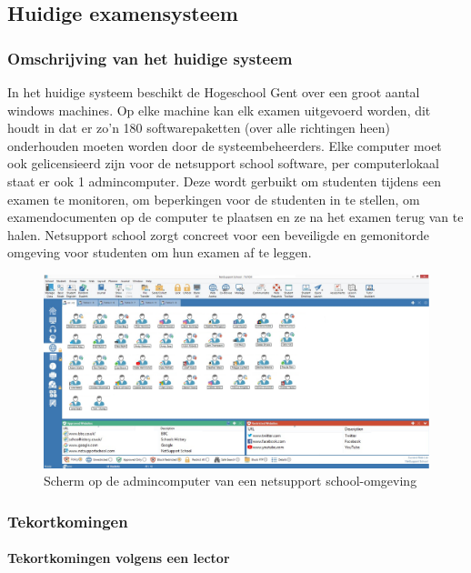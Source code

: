 \subsection{Huidige examensysteem}

\subsubsection{Omschrijving van het huidige systeem}
In het huidige systeem beschikt de Hogeschool Gent over een groot aantal windows machines. Op elke machine kan elk examen uitgevoerd worden, dit houdt in dat er zo'n 180 softwarepaketten (over alle richtingen heen) onderhouden moeten worden door de systeembeheerders. Elke computer moet ook gelicensieerd zijn voor de netsupport school software, per computerlokaal staat er ook 1 admincomputer. Deze wordt gerbuikt om studenten tijdens een examen te monitoren, om beperkingen voor de studenten in te stellen, om examendocumenten op de computer te plaatsen en ze na het examen terug van te halen. Netsupport school zorgt concreet voor een beveiligde en gemonitorde omgeving voor studenten om hun examen af te leggen. 



\begin{figure}
\includegraphics[width=\linewidth]{img/NetsupportAdmin.png}
\caption{Scherm op de admincomputer van een netsupport school-omgeving}
\label{fig:NetSupport1}
\end{figure}


\subsubsection{Tekortkomingen}


\paragraph{Tekortkomingen volgens een lector}

